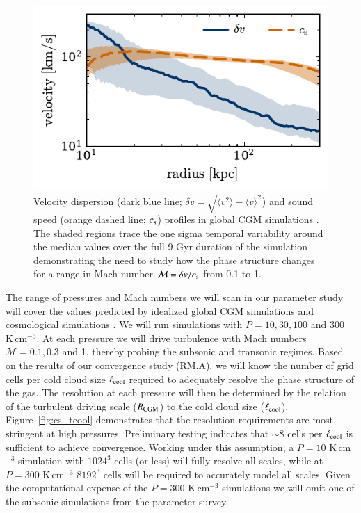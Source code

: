 \documentclass[11pt,letterpaper,english]{article}
\begin{document}
\begin{figure}[t]
    \centering
    \begin{minipage}{0.6\textwidth}
        \includegraphics[width=\textwidth]{velocities.pdf} 
    \end{minipage}\hfill
    \begin{minipage}{0.4\textwidth}
        \centering
\caption{ Velocity dispersion (dark blue line; $\delta v = \sqrt{\langle v^2 \rangle - \langle v \rangle^2}$) and sound speed (orange dashed line; $c_{\rm s}$) profiles in global CGM simulations \cite{Fielding17}. The shaded regions trace the one sigma temporal variability around the median values over the full 9 Gyr duration of the simulation demonstrating the need to study how the phase structure changes for a range in Mach number $\mathcal{M} = \delta v /  c_{\rm s}$ from 0.1 to 1. \label{fig:velocities}} 
\end{minipage}
\end{figure}

The range of pressures and Mach numbers we will scan in our parameter study will cover the values predicted by idealized global CGM simulations \cite{Fielding17} and cosmological simulations \cite{Nelson+16}. We will run simulations with $P = 10, 30, 100$ and 300 K\,cm$^{-3}$.  At each pressure we will drive turbulence with Mach numbers $\mathcal{M} = 0.1, 0.3$ and 1, thereby probing the subsonic and transonic regimes. 
Based on the results of our convergence study (RM.A), we will know the number of grid cells per cold cloud size $\ell_{\rm cool}$ required to adequately resolve the phase structure of the gas.
The resolution at each pressure will then be determined by the relation of the turbulent driving scale ($R_{\rm CGM}$) to the cold cloud size ($\ell_{\rm cool}$).
Figure~\ref{fig:cs_tcool} demonstrates that the resolution requirements are most stringent at high pressures. Preliminary testing indicates that ${\sim}8 $ cells per $\ell_{\rm cool}$ is sufficient to achieve convergence. Working under this assumption, a $P=10$ K\,cm$^{-3}$ simulation with $1024^3$ cells (or less) will fully resolve all scales, while at $P=300$ K\,cm$^{-3}$ $8192^3$ cells will be required to accurately model all scales. Given the computational expense of the $P=300$ K\,cm$^{-3}$ simulations we will omit one of the subsonic simulations from the parameter survey.
\end{document}
